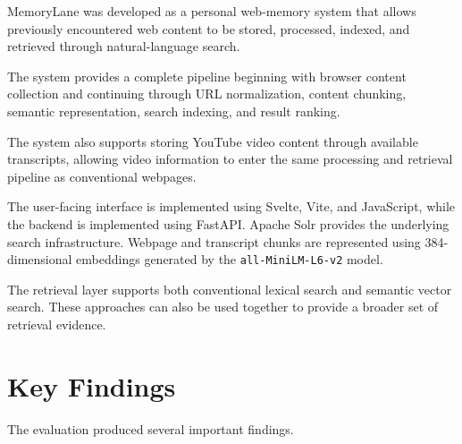 \documentclass{tietreport}
\begin{document}
MemoryLane was developed as a personal web-memory system that
allows previously encountered web content to be stored,
processed, indexed, and retrieved through natural-language
search.

The system provides a complete pipeline beginning with browser
content collection and continuing through URL normalization,
content chunking, semantic representation, search indexing, and
result ranking.

The system also supports storing YouTube video content through
available transcripts, allowing video information to enter the
same processing and retrieval pipeline as conventional webpages.

The user-facing interface is implemented using Svelte, Vite,
and JavaScript, while the backend is implemented using FastAPI.
Apache Solr provides the underlying search infrastructure.
Webpage and transcript chunks are represented using
384-dimensional embeddings generated by the
\texttt{all-MiniLM-L6-v2} model.

The retrieval layer supports both conventional lexical search
and semantic vector search. These approaches can also be used
together to provide a broader set of retrieval evidence.

\section{Key Findings}

The evaluation produced several important findings.
\end{document}

